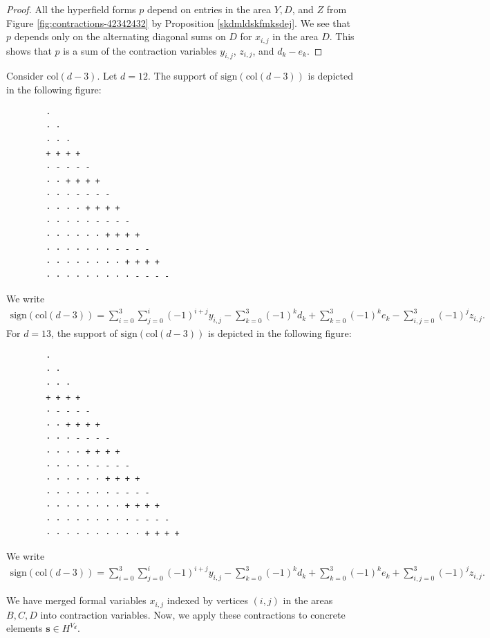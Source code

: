 \begin{proof}
    All the hyperfield forms \( p \) depend on entries in the area \( Y, D \), and \( Z \) from Figure \ref{fig:contractions-42342432} by Proposition \ref{skdmldskfmksdej}. We see that \( p \) depends only on the alternating diagonal sums on \( D \) for \( x_{i,j} \) in the area \( D \). This shows that \( p \) is a sum of the contraction variables \( y_{i,j} \), \( z_{i,j} \), and \( d_k - e_k \).
\end{proof}

\begin{example}
    Consider \( \mathrm{col}(d-3) \). Let \( d = 12 \). The support of \( \mathrm{sign}(\mathrm{col}(d-3)) \) is depicted in the following figure:
    \begin{verbatim}
        · 
        · · 
        · · · 
        + + + + 
        · - - - - 
        · · + + + + 
        · · · - - - - 
        · · · · + + + + 
        · · · · · - - - - 
        · · · · · · + + + + 
        · · · · · · · - - - - 
        · · · · · · · · + + + + 
        · · · · · · · · · - - - -
    \end{verbatim}
    We write 
    \begin{align*}
        \mathrm{sign}(\mathrm{col}(d-3)) = \sum^3_{i=0}\sum^i_{j=0} (-1)^{i+j}y_{i,j} - \sum^3_{k=0}(-1)^{k}d_k  + \sum^3_{k=0}(-1)^{k}e_k - \sum^3_{i,j=0}(-1)^{j}z_{i,j}.
    \end{align*}
    For \( d = 13 \), the support of \( \mathrm{sign}(\mathrm{col}(d-3)) \) is depicted in the following figure:
    \begin{verbatim}
        · 
        · · 
        · · · 
        + + + + 
        · - - - - 
        · · + + + + 
        · · · - - - - 
        · · · · + + + + 
        · · · · · - - - - 
        · · · · · · + + + + 
        · · · · · · · - - - - 
        · · · · · · · · + + + + 
        · · · · · · · · · - - - -
        · · · · · · · · · · + + + +
    \end{verbatim}
    We write 
    \begin{align*}
        \mathrm{sign}(\mathrm{col}(d-3)) = \sum^3_{i=0}\sum^i_{j=0} (-1)^{i+j}y_{i,j} - \sum^3_{k=0}(-1)^{k}d_k  + \sum^3_{k=0}(-1)^{k}e_k + \sum^3_{i,j=0}(-1)^{j}z_{i,j}.
    \end{align*}
\end{example}

We have merged formal variables \( x_{i,j} \) indexed by vertices \( (i,j) \) in the areas \( B, C, D \) into contraction variables. Now, we apply these contractions to concrete elements \( \mathbf{s} \in H^{V_d} \).

